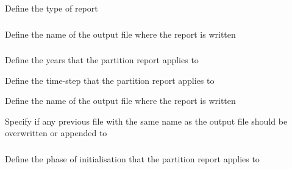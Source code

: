 
 {Define the type of report}

\subsubsection[Print the spatial co-ordinates of each spatial cell (i.e., row and column labels of each spatial cell) of the spatial structure]{}

 {Define the name of the output file where the report is written}

\subsubsection[Print the partition]{}

 {Define the years that the partition report applies to}

 {Define the time-step that the partition report applies to}

 {Define the name of the output file where the report is written}

 {Specify if any previous file with the same name as the output file should be overwritten or appended to}

\subsubsection[Print the partition at initialisation]{}

 {Define the phase of initialisation that the partition report applies to}

